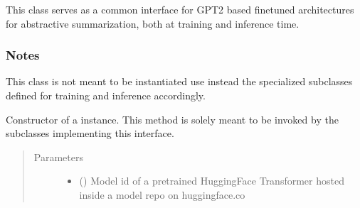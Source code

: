 \documentclass[letterpaper,10pt,english]{sphinxmanual}
\begin{document}
\begin{fulllineitems}
\label{\detokenize{code:gpt2_summarizer.GPT2Summarizer}}
\sphinxAtStartPar
This class serves as a common interface for GPT\sphinxhyphen{}2 based fine\sphinxhyphen{}tuned architectures
for abstractive summarization, both at training and inference time.
\subsubsection*{Notes}

\sphinxAtStartPar
This class is not meant to be instantiated \sphinxhyphen{} use instead the specialized subclasses defined for
training and inference accordingly.

\begin{fulllineitems}
\label{\detokenize{code:gpt2_summarizer.GPT2Summarizer.__init__}}
\sphinxAtStartPar
Constructor of a  instance. This method is solely meant to be
invoked by the subclasses implementing this interface.
\begin{quote}\begin{description}
\item[{Parameters}] \leavevmode\begin{itemize}
\item {} 
\sphinxAtStartPar
{} () \textendash{} Model id of a pretrained HuggingFace Transformer hosted inside a model repo on
huggingface.co


\end{itemize}
\end{description}
\end{quote}
\end{fulllineitems}
\end{fulllineitems}
\end{document}
